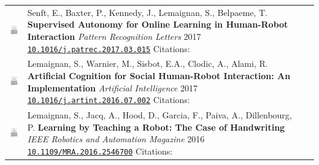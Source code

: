 \documentclass[11pt]{report}
\begin{document}
\begin{tabular}{p{1.8cm}p{6cm}p{7cm}}
    \vspace{0cm}\includegraphics[width=2cm]{thumbs/2019-science.jpg} &

    Senft, E., Baxter, P., Kennedy, J., Lemaignan, S., Belpaeme, T.
    \textbf{Supervised Autonomy for Online Learning in Human-Robot Interaction}
    \newline \textit{Pattern Recognition Letters} 2017
    \newline \texttt{\href{https://doi.org/10.1016/j.patrec.2017.03.015}{10.1016/j.patrec.2017.03.015}}
    \newline Citations: 
    & \small \\


    \vspace{0cm}\includegraphics[width=2cm]{thumbs/2019-science.jpg} &

    Lemaignan, S., Warnier, M., Sisbot, E.A., Clodic, A., Alami, R.
    \textbf{Artificial Cognition for Social Human-Robot Interaction: An
    Implementation}
    \newline \textit{Artificial Intelligence} 2017
    \newline \texttt{\href{https://doi.org/10.1016/j.artint.2016.07.002}{10.1016/j.artint.2016.07.002}}
    \newline Citations: 
    & \small \\


    \vspace{0cm}\includegraphics[width=2cm]{thumbs/2019-science.jpg} &

    Lemaignan, S., Jacq, A., Hood, D., Garcia, F., Paiva, A., Dillenbourg, P.
    \textbf{Learning by Teaching a Robot: The Case of Handwriting}
    \newline \textit{IEEE Robotics and Automation Magazine} 2016
    \newline \texttt{\href{https://doi.org/10.1109/MRA.2016.2546700}{10.1109/MRA.2016.2546700}}
    \newline Citations: 
    & \small \\



\end{tabular}
\end{document}
